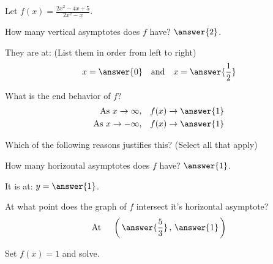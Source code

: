 \documentclass{ximera}
\author{Bobby Ramsey}
\begin{document}
Let $\displaystyle f(x) = \frac{2x^2-4x+5}{2x^2-x}$.

\begin{exercise}
	How many vertical asymptotes does $f$ have?   $\answer{2}$.
	\begin{exercise}
		They are at: (List them in order from left to right)
		\[ x = \answer{0}  \quad \text{and} \quad x = \answer{\frac{1}{2}} \]
	\end{exercise}
\end{exercise}

\begin{exercise}
	What is the end behavior of $f$?
	\begin{align*}
		\text{As} \,\, x \to \infty, &\quad f(x) \to \answer{1}\\
		\text{As} \,\, x \to -\infty, &\quad f(x) \to \answer{1}\\
	\end{align*}
	\begin{exercise}	
		Which of the following reasons justifies this?  (Select all that apply)
		\begin{selectAll}
		\end{selectAll}
	\end{exercise}	
\end{exercise}

\begin{exercise}
	How many horizontal asymptotes does $f$ have?	$\answer{1}$.
	\begin{exercise}
		It is at: $y = \answer{1}$. 
		
		\begin{exercise}
			At what point does the graph of $f$ intersect it's horizontal asymptote?
			\[ \text{At }\quad \left( \,\answer{\frac{5}{3}} \, , \, \answer{1} \, \right) \]
			\begin{feedback}
				Set $f(x) = 1$ and solve.
			\end{feedback}
		\end{exercise}
	\end{exercise}
\end{exercise}
\end{document}
